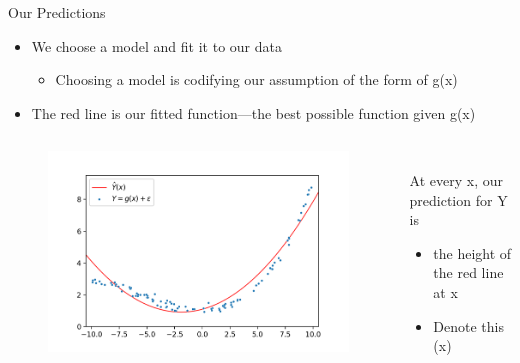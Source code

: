 \documentclass[aspectratio=169]{../latex_main/tntbeamer}  %
\begin{document}
	
	\begin{frame}{Our Predictions}
	    \begin{itemize}
	        \item We choose a model and fit it to our data
	        \begin{itemize}
	            \item Choosing a model is codifying our assumption of the form of g(x)
	        \end{itemize}
	        \item The red line is our fitted function—the best possible function given g(x)
	    \end{itemize}
	    \begin{columns}
	        \begin{column}{.4\textwidth}
	                \begin{figure}
	                    \includegraphics[scale=.5]{Bild3}
	                \end{figure}
	        \end{column}
	        
	        
	         \begin{column}{.4\textwidth}
	         \\ \bigskip
	         \bigskip
	               At every x, our prediction for Y is
	                \begin{itemize}
	                    \item the height of the red line at x
	                    \item Denote this  (x)
	                \end{itemize}
	        \end{column}
	    \end{columns}
	\end{frame}
\end{document}
